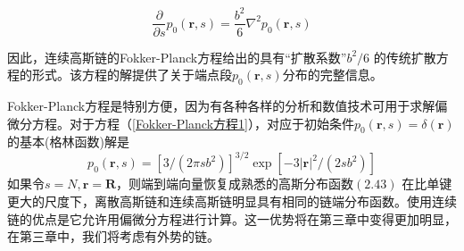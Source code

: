 \begin{equation}
\frac{\partial}{\partial s}p_0(\mathbf{r},s)=\frac{b^2}{6}\nabla ^2 p_0(\mathbf{r},s) \label{Fokker-Planck方程1}
\end{equation}

因此，连续高斯链的Fokker-Planck方程给出的具有“扩散系数”$b^2/6$
的传统扩散方程的形式。该方程的解提供了关于端点段$p_0(\mathbf{r},s)$分布的完整信息。

Fokker-Planck方程是特别方便，因为有各种各样的分析和数值技术可用于求解偏微分方程。对于方程（\ref{Fokker-Planck方程1}），对应于初始条件$p_0(\mathbf{r},s)=\delta(\mathbf{r})$的基本(格林函数)解是
\begin{equation}
p_0(\mathbf{r},s)=\left[ 3/(2 \pi sb^2) \right]^{3/2}\exp \left[ -3\left| \mathbf{r} \right|^2/(2sb^2) \right]
\end{equation}
如果令$s=N,\mathbf{r}=\mathbf{R}$，则端到端向量恢复成熟悉的高斯分布函数$(2.43)$
在比单键更大的尺度下，离散高斯链和连续高斯链明显具有相同的链端分布函数。使用连续链的优点是它允许用偏微分方程进行计算。这一优势将在第三章中变得更加明显，在第三章中，我们将考虑有外势的链。
\endinput